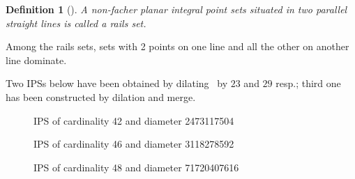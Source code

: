 \documentclass[12pt]{article}
\theoremstyle{theorem}
\theoremstyle{dfn}
\newtheorem{dfn}{Definition}
\theoremstyle{remark}
\begin{document}
\begin{dfn}[\cite{avdeev2019particular}]
	A non-facher planar integral point sets situated in two parallel straight lines
	is called a \textit{rails} set.
\end{dfn}

Among the rails sets, sets with 2 points on one line and all the other on another line dominate.


Two IPSs below have been obtained by dilating~\cite[Fig. 34]{avdeev2019particular} by $23$ and $29$  resp.;
third one has been constructed by dilation and merge.



\begin{figure}[h!]
\parbox{1\linewidth}{\caption{IPS of cardinality 42 and diameter 2473117504}
\label{42_symm.png}}
\end{figure}

\begin{figure}[h!]
\parbox{1\linewidth}{\caption{IPS of cardinality 46 and diameter 3118278592}
\label{46_symm.png}}
\end{figure}

\begin{figure}[h!]
\parbox{1\linewidth}{\caption{IPS of cardinality 48 and diameter 71720407616}
\label{48_symm.png}}
\end{figure}
\end{document}
